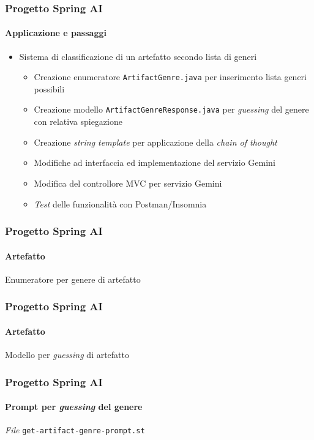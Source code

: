 %
\begin{frame}[t,fragile] \frametitle{Progetto Spring AI}
    \framesubtitle{Applicazione e passaggi}
    {\small
    \begin{itemize}[leftmargin=10pt,align=right]
        \item[\alert{\faArrowCircleRight}] Sistema di classificazione di un artefatto secondo lista di generi
        \begin{itemize}[leftmargin=10pt,align=right]
            \item[\alertedcircled{1}] Creazione enumeratore \texttt{ArtifactGenre.java} per inserimento lista generi possibili
            \item[\alertedcircled{2}] Creazione modello \texttt{ArtifactGenreResponse.java} per \textit{guessing} del genere con relativa spiegazione
            \item[\alertedcircled{3}] Creazione \textit{string template} per applicazione della \textit{chain of thought}
            \item[\alertedcircled{4}] Modifiche ad interfaccia ed implementazione del servizio Gemini
            \item[\alertedcircled{5}] Modifica del controllore MVC per servizio Gemini
            \item[\alertedcircled{6}] \textit{Test} delle funzionalità con Postman/Insomnia 
        \end{itemize}
    \end{itemize}
    }
\end{frame}
%
\begin{frame}[t,fragile] \frametitle{Progetto Spring AI}
    \framesubtitle{Artefatto}
        \begin{block}{Enumeratore per genere di artefatto}
			{\tiny}
    	\end{block}
\end{frame}
%
\begin{frame}[t,fragile] \frametitle{Progetto Spring AI}
    \framesubtitle{Artefatto}
        \begin{block}{Modello per \textit{guessing} di artefatto}
			{\tiny}
    	\end{block}
\end{frame}
%
\begin{frame}[t,fragile] \frametitle{Progetto Spring AI}
    \framesubtitle{Prompt per \textit{guessing} del genere}
        \begin{block}{\textit{File} \texttt{get-artifact-genre-prompt.st}}
			{\scriptsize}
    	\end{block}
\end{frame}
